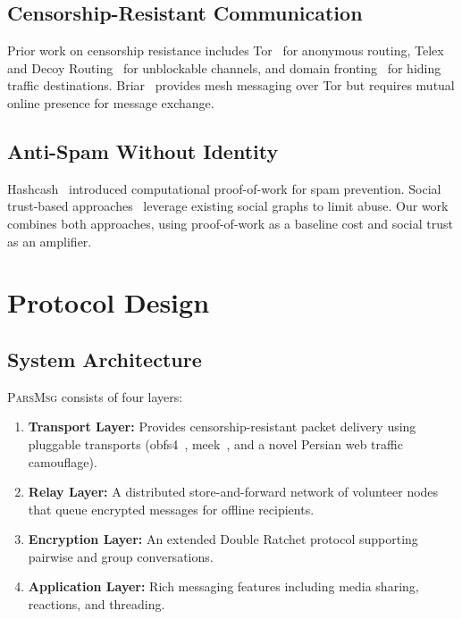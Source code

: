 \documentclass[11pt,a4paper]{article}
\newcommand{\protname}{\textsc{ParsMsg}\xspace}
\begin{document}
\subsection{Censorship-Resistant Communication}

Prior work on censorship resistance includes Tor~\citep{dingledine2004tor} for anonymous routing, Telex~\citep{wustrow2011telex} and Decoy Routing~\citep{karlin2011decoy} for unblockable channels, and domain fronting~\citep{fifield2015blocking} for hiding traffic destinations. Briar~\citep{briar2018} provides mesh messaging over Tor but requires mutual online presence for message exchange.

\subsection{Anti-Spam Without Identity}

Hashcash~\citep{back2002hashcash} introduced computational proof-of-work for spam prevention. Social trust-based approaches~\citep{mislove2008ostra} leverage existing social graphs to limit abuse. Our work combines both approaches, using proof-of-work as a baseline cost and social trust as an amplifier.

\section{Protocol Design}

\subsection{System Architecture}

\protname consists of four layers:

\begin{enumerate}[label=\textbf{L\arabic*}:]
    \item \textbf{Transport Layer:} Provides censorship-resistant packet delivery using pluggable transports (obfs4~\citep{angel2015obfs4}, meek~\citep{fifield2015meek}, and a novel Persian web traffic camouflage).
    \item \textbf{Relay Layer:} A distributed store-and-forward network of volunteer nodes that queue encrypted messages for offline recipients.
    \item \textbf{Encryption Layer:} An extended Double Ratchet protocol supporting pairwise and group conversations.
    \item \textbf{Application Layer:} Rich messaging features including media sharing, reactions, and threading.
\end{enumerate}
\end{document}
